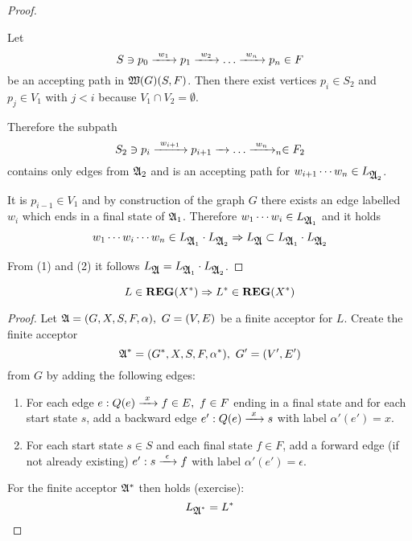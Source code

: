 \begin{proof}
\begin{enumerate}
  Let \[ S \ni p_0 \xrightarrow{\ {w_1}\ } p_1 \xrightarrow{\ {w_2}\ } \ldots \xrightarrow{\ {w_n}\ } p_n \in F \]
  be an accepting path in $\mbox{$\mathfrak{W}({G})$}(S, F)$. Then there exist vertices $p_i
  \in S_2$ and $p_j \in V_1$ with $j < i$ because $V_1 \cap V_2 = \emptyset$.
  
  Therefore the subpath 
  \[ S_2 \ni p_i \xrightarrow{\ {w_{i+1}}\ } p_{i+1} \xrightarrow{\ {}\ } \ldots \xrightarrow{\ {w_n}\ } _n \in F_2 \]
  contains only edges from $\mbox{$\mathfrak{A}$}_2$ and is an accepting path for 
  $w_{i+1} \cdots w_n \in L_{\mbox{$\mathfrak{A}$}_2}$.
  
  It is $p_{i-1} \in V_1$ and by construction of the graph $G$ there exists
  an edge labelled $w_i$ which ends in a final state of $\mbox{$\mathfrak{A}$}_1$. Therefore
  $w_1 \cdots w_i \in L_{\mbox{$\mathfrak{A}$}_1}$ and it holds 
  \[ w_1 \cdots w_i \cdots w_n \in L_{\mbox{$\mathfrak{A}$}_1} \cdot L_{\mbox{$\mathfrak{A}$}_2} \Rightarrow
  L_{\mbox{$\mathfrak{A}$}} \subset L_{\mbox{$\mathfrak{A}$}_1} \cdot L_{\mbox{$\mathfrak{A}$}_2} \]
\end{enumerate}

From (1) and (2) it follows $L_{\mbox{$\mathfrak{A}$}} = L_{\mbox{$\mathfrak{A}$}_1} \cdot L_{\mbox{$\mathfrak{A}$}_2}$.
\end{proof}

\bigskip
\begin{theorem}
\[ L \in \mbox{{\bf REG}}(X^*) \Rightarrow L^* \in \mbox{{\bf REG}}(X^*) \]
\end{theorem}

\begin{proof}
Let $\mbox{$\mathfrak{A}$} = (G, X, S, F, \alpha),\ G = (V, E)$	be a finite acceptor for $L$.
Create the finite acceptor
\[ \mbox{$\mathfrak{A}$}^* = (G^*, X, S, F, \alpha^*),\ G'=(V', E') \]
from $G$ by adding the following edges: 

\begin{enumerate}
  \item For each edge $e : Q(e) \xrightarrow{\ {x}\ } f \in E,\ f \in F$ ending in a final 
  state and for each start state $s$, add a backward edge $e' : Q(e) \xrightarrow{\ {x}\ } s$ 
  with label $\alpha'(e') = x$.
  \item For each start state $s \in S$ and each final state $f \in F$, add a
  forward edge (if not already existing) $e' : s \xrightarrow{\ {\epsilon}\ } f$ with
  label $\alpha'(e') = \epsilon$.
\end{enumerate}

\begin{center}

\end{center}

For the finite acceptor $\mbox{$\mathfrak{A^*}$}$ then holds (exercise):
\[ L_{\mbox{$\mathfrak{A}$}^*} = L^* \]
\end{proof}

